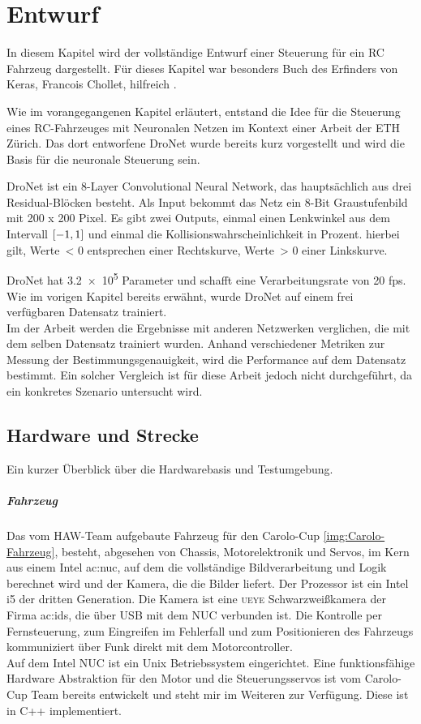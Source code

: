 %
\chapter{Entwurf}
In diesem Kapitel wird der vollständige Entwurf einer Steuerung für ein RC Fahrzeug dargestellt.
Für dieses Kapitel war besonders Buch des Erfinders von Keras, Francois Chollet, hilfreich \cite{chollet2018deep}.

Wie im vorangegangenen Kapitel erläutert, entstand die Idee für die Steuerung eines RC-Fahrzeuges mit Neuronalen Netzen im Kontext einer Arbeit der ETH Zürich.
Das dort entworfene DroNet wurde bereits kurz vorgestellt und wird die Basis für die neuronale Steuerung sein. 

DroNet ist ein 8-Layer Convolutional Neural Network, das hauptsächlich aus drei Residual-Blöcken besteht. Als Input bekommt das Netz ein 8-Bit Graustufenbild mit 200 x 200 Pixel. Es gibt zwei Outputs, einmal einen Lenkwinkel aus dem Intervall $\interval{-1}{1}$ und einmal die Kollisionswahrscheinlichkeit in Prozent. hierbei gilt, Werte~< 0 entsprechen einer Rechtskurve, Werte~> 0 einer Linkskurve.

DroNet hat \num{3.2e5} Parameter und schafft eine Verarbeitungsrate von 20 fps.
Wie im vorigen Kapitel bereits erwähnt, wurde DroNet auf einem frei verfügbaren Datensatz trainiert.\\
Im der Arbeit werden die Ergebnisse mit anderen Netzwerken verglichen, die mit dem selben Datensatz trainiert wurden. Anhand verschiedener Metriken zur Messung der Bestimmungsgenauigkeit, wird die Performance auf dem Datensatz bestimmt. Ein solcher Vergleich ist für diese Arbeit jedoch nicht durchgeführt, da ein konkretes Szenario untersucht wird.
\newpage 

\section{Hardware und Strecke}
Ein kurzer Überblick über die Hardwarebasis und Testumgebung.
\paragraph{Fahrzeug}
Das vom HAW-Team aufgebaute Fahrzeug für den Carolo-Cup \ref{img:Carolo-Fahrzeug}, besteht, abgesehen von Chassis, Motorelektronik und Servos, im Kern aus einem Intel \gls{ac:nuc}, auf dem die vollständige Bildverarbeitung und Logik berechnet wird und der Kamera, die die Bilder liefert. Der Prozessor ist ein Intel i5 der dritten Generation. Die Kamera ist eine \textsc{ueye} Schwarzweißkamera der Firma \gls{ac:ids}, die über USB mit dem NUC verbunden ist. 
Die Kontrolle per Fernsteuerung, zum Eingreifen im Fehlerfall und zum Positionieren des Fahrzeugs kommuniziert über Funk direkt mit dem Motorcontroller.\\
Auf dem Intel NUC ist ein Unix Betriebssystem eingerichtet.
Eine funktionsfähige Hardware Abstraktion für den Motor und die Steuerungsservos ist vom Carolo-Cup Team bereits entwickelt und steht mir im Weiteren zur Verfügung. Diese ist in C++ implementiert.

